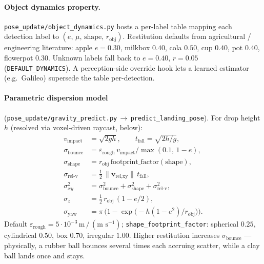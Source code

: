 \documentclass[11pt]{article}
\newcommand{\file}[1]{\texttt{#1}}
\begin{document}
\paragraph{Object dynamics property.}
\file{pose\_update/object\_dynamics.py} hosts a per-label table
mapping each detection label to $(e,\,\mu,\,\text{shape},\,r_{\text{obj}})$.
Restitution defaults from agricultural / engineering literature: apple
$e=0.30$, milkbox $0.40$, cola $0.50$, cup $0.40$, pot $0.40$,
flowerpot $0.30$. Unknown labels fall back to $e=0.40,\,r=0.05$
(\texttt{DEFAULT\_DYNAMICS}). A perception-side override hook lets a
learned estimator (e.g.\ Galileo) supersede the table per-detection.

\paragraph{Parametric dispersion model}
(\file{pose\_update/gravity\_predict.py}\,$\to$\,\texttt{predict\_landing\_pose}).
For drop height $h$ (resolved via voxel-driven raycast, below):
\begin{equation}\label{eq:gravity_sigma}
\begin{aligned}
v_{\text{impact}} &= \sqrt{2 g h}, \qquad
  t_{\text{fall}}  = \sqrt{2 h / g}, \\
\sigma_{\text{bounce}} &= \varepsilon_{\text{rough}}\,v_{\text{impact}} \big/ \max(0.1,\,1-e), \\
\sigma_{\text{shape}}  &= r_{\text{obj}}\,\text{footprint\_factor}(\text{shape}), \\
\sigma_{\text{rel-v}}  &= \tfrac{1}{2}\,\|\bm v_{\text{rel,xy}}\|\,t_{\text{fall}}, \\
\sigma_{xy}^2 &= \sigma_{\text{bounce}}^2 + \sigma_{\text{shape}}^2 + \sigma_{\text{rel-v}}^2, \\
\sigma_{z} &= \tfrac{1}{2}\,r_{\text{obj}}\,(1 - e/2), \\
\sigma_{\text{yaw}} &= \pi\,\bigl(1 - \exp\!\bigl(-h(1-e^2)/r_{\text{obj}}\bigr)\bigr).
\end{aligned}
\end{equation}
Default $\varepsilon_{\text{rough}} = 5\!\cdot\!10^{-3}\,\text{m}\,/\,(\text{m s}^{-1})$;
\texttt{shape\_footprint\_factor}: spherical $0.25$, cylindrical
$0.50$, box $0.70$, irregular $1.00$. Higher restitution increases
$\sigma_{\text{bounce}}$ — physically, a rubber ball bounces several
times each accruing scatter, while a clay ball lands once and stays.
\end{document}
